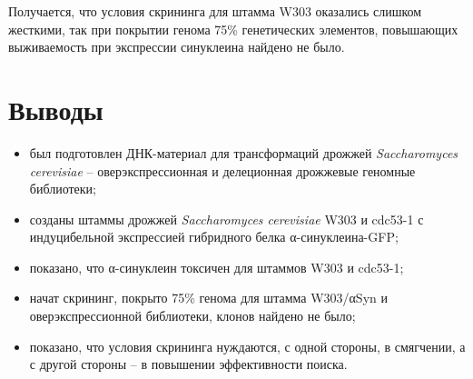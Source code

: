 Получается, что условия скрининга для штамма W303 оказались слишком жесткими, так при покрытии генома 75\% генетических элементов, повышающих выживаемость при экспрессии синуклеина найдено не было. 


\section{Выводы}


\begin{itemize}[label={--}]
	
\item был подготовлен ДНК-материал для трансформаций дрожжей \emph{Saccharomyces cerevisiae} -- оверэкспрессионная и делеционная дрожжевые геномные библиотеки;
\item созданы штаммы дрожжей \emph{Saccharomyces cerevisiae} W303 и cdc53-1 с индуцибельной экспрессией гибридного белка α-синуклеина-GFP;
\item показано, что α-синуклеин токсичен для штаммов W303 и cdc53-1;
\item начат скрининг, покрыто 75\% генома для штамма W303/αSyn и оверэкспрессионной библиотеки, клонов найдено не было;
\item показано, что условия скрининга нуждаются, с одной стороны, в смягчении, а с другой стороны -- в повышении эффективности поиска.
\end{itemize}






 




